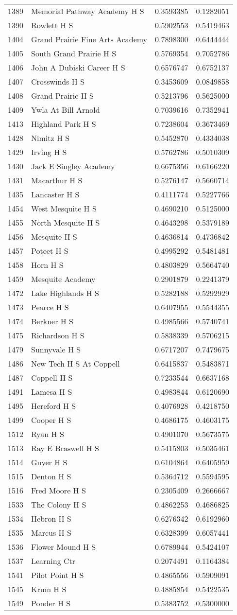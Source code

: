 \documentclass[
]{article}
\begin{document}
\begin{longtable}[]{@{}llrr@{}}
1389 & Memorial Pathway Academy H S & 0.3593385 &
0.1282051\tabularnewline
1390 & Rowlett H S & 0.5902553 & 0.5419463\tabularnewline
1404 & Grand Prairie Fine Arts Academy & 0.7898300 &
0.6444444\tabularnewline
1405 & South Grand Prairie H S & 0.5769354 & 0.7052786\tabularnewline
1406 & John A Dubiski Career H S & 0.6576747 & 0.6752137\tabularnewline
1407 & Crosswinds H S & 0.3453609 & 0.0849858\tabularnewline
1408 & Grand Prairie H S & 0.5213796 & 0.5625000\tabularnewline
1409 & Ywla At Bill Arnold & 0.7039616 & 0.7352941\tabularnewline
1413 & Highland Park H S & 0.7238604 & 0.3673469\tabularnewline
1428 & Nimitz H S & 0.5452870 & 0.4334038\tabularnewline
1429 & Irving H S & 0.5762786 & 0.5010309\tabularnewline
1430 & Jack E Singley Academy & 0.6675356 & 0.6166220\tabularnewline
1431 & Macarthur H S & 0.5276147 & 0.5660714\tabularnewline
1435 & Lancaster H S & 0.4111774 & 0.5227766\tabularnewline
1454 & West Mesquite H S & 0.4690210 & 0.5125000\tabularnewline
1455 & North Mesquite H S & 0.4643298 & 0.5379189\tabularnewline
1456 & Mesquite H S & 0.4636814 & 0.4736842\tabularnewline
1457 & Poteet H S & 0.4995292 & 0.5481481\tabularnewline
1458 & Horn H S & 0.4803829 & 0.5664740\tabularnewline
1459 & Mesquite Academy & 0.2901879 & 0.2241379\tabularnewline
1472 & Lake Highlands H S & 0.5282188 & 0.5292929\tabularnewline
1473 & Pearce H S & 0.6407955 & 0.5544355\tabularnewline
1474 & Berkner H S & 0.4985566 & 0.5740741\tabularnewline
1475 & Richardson H S & 0.5838339 & 0.5706215\tabularnewline
1479 & Sunnyvale H S & 0.6717207 & 0.7479675\tabularnewline
1486 & New Tech H S At Coppell & 0.6415837 & 0.5483871\tabularnewline
1487 & Coppell H S & 0.7233544 & 0.6637168\tabularnewline
1491 & Lamesa H S & 0.4983844 & 0.6120690\tabularnewline
1495 & Hereford H S & 0.4076928 & 0.4218750\tabularnewline
1499 & Cooper H S & 0.4686175 & 0.4603175\tabularnewline
1512 & Ryan H S & 0.4901070 & 0.5673575\tabularnewline
1513 & Ray E Braswell H S & 0.5415803 & 0.5035461\tabularnewline
1514 & Guyer H S & 0.6104864 & 0.6405959\tabularnewline
1515 & Denton H S & 0.5364712 & 0.5594595\tabularnewline
1516 & Fred Moore H S & 0.2305409 & 0.2666667\tabularnewline
1533 & The Colony H S & 0.4862253 & 0.4686825\tabularnewline
1534 & Hebron H S & 0.6276342 & 0.6192960\tabularnewline
1535 & Marcus H S & 0.6328399 & 0.6057441\tabularnewline
1536 & Flower Mound H S & 0.6789944 & 0.5424107\tabularnewline
1537 & Learning Ctr & 0.2074491 & 0.1164384\tabularnewline
1541 & Pilot Point H S & 0.4865556 & 0.5909091\tabularnewline
1545 & Krum H S & 0.4885854 & 0.5422535\tabularnewline
1549 & Ponder H S & 0.5383752 & 0.5300000\tabularnewline

\end{longtable}
\end{document}
